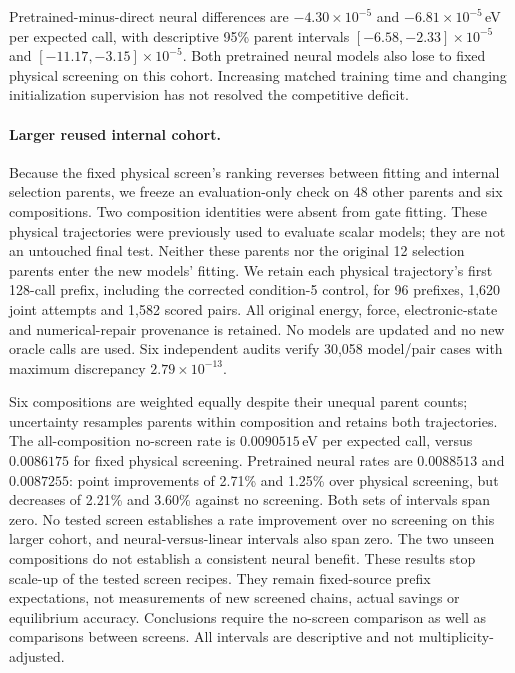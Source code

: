 Pretrained-minus-direct neural differences are $-4.30\times10^{-5}$ and
$-6.81\times10^{-5}$\,eV per expected call, with descriptive 95\% parent intervals
$[-6.58,-2.33]\times10^{-5}$ and $[-11.17,-3.15]\times10^{-5}$.
Both pretrained neural models also lose to fixed physical screening on this
cohort. Increasing matched training time and changing initialization supervision
has not resolved the competitive deficit.

\newpage
\paragraph{Larger reused internal cohort.}
Because the fixed physical screen's ranking reverses between fitting and internal
selection parents, we freeze an evaluation-only check on 48 other parents and
six compositions. Two composition identities were absent from gate fitting.
These physical trajectories were previously used to evaluate scalar models;
they are not an untouched final test. Neither these parents nor the original
12 selection parents enter the new models' fitting. We retain each physical
trajectory's first 128-call prefix, including the corrected condition-5 control,
for 96 prefixes, 1,620 joint attempts and 1,582 scored pairs. All original energy,
force, electronic-state and numerical-repair provenance is retained. No models
are updated and no new oracle calls are used. Six independent audits verify
30,058 model/pair cases with maximum discrepancy $2.79\times10^{-13}$.

Six compositions are weighted equally despite their unequal parent counts;
uncertainty resamples parents within composition and retains both trajectories.
The all-composition no-screen rate is $0.0090515$\,eV per expected call, versus
$0.0086175$ for fixed physical screening. Pretrained neural rates are
$0.0088513$ and $0.0087255$: point improvements of 2.71\% and 1.25\% over physical
screening, but decreases of 2.21\% and 3.60\% against no screening. Both sets of
intervals span zero. No tested screen establishes a rate improvement over no
screening on this larger cohort, and neural-versus-linear intervals also span
zero. The two unseen compositions do not establish a consistent neural benefit.
These results stop scale-up of the tested screen recipes. They remain
fixed-source prefix expectations, not measurements of new screened chains,
actual savings or equilibrium accuracy. Conclusions require the no-screen comparison as well as
comparisons between screens. All intervals are descriptive and not
multiplicity-adjusted.
